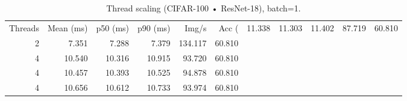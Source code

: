 \begin{table}
\caption{Thread scaling (CIFAR-100 • ResNet-18), batch=1.}
\label{tab:threads_cifar100_resnet18}
\begin{tabular}{rrrrrr}
\toprule
Threads & Mean (ms) & p50 (ms) & p90 (ms) & Img/s & Acc (%
 & 11.338 & 11.303 & 11.402 & 87.719 & 60.810 \\
2 & 7.351 & 7.288 & 7.379 & 134.117 & 60.810 \\
4 & 10.540 & 10.316 & 10.915 & 93.720 & 60.810 \\
4 & 10.457 & 10.393 & 10.525 & 94.878 & 60.810 \\
4 & 10.656 & 10.612 & 10.733 & 93.974 & 60.810 \\
\bottomrule
\end{tabular}
\end{table}
